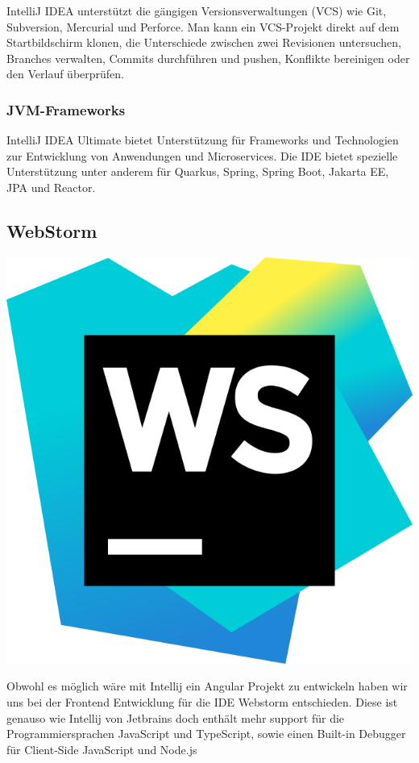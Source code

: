IntelliJ IDEA unterstützt die gängigen Versionsverwaltungen (VCS) wie Git, Subversion, Mercurial und Perforce. 
Man kann ein VCS-Projekt direkt auf dem Startbildschirm klonen, die Unterschiede zwischen zwei Revisionen untersuchen, Branches verwalten, 
Commits durchführen und pushen, Konflikte bereinigen oder den Verlauf überprüfen. 
\cite{sysarch-intellij-1}


\subsubsection{JVM-Frameworks}

IntelliJ IDEA Ultimate bietet Unterstützung für Frameworks und Technologien zur Entwicklung von Anwendungen und Microservices. 
Die IDE bietet spezielle Unterstützung unter anderem für Quarkus, Spring, Spring Boot, Jakarta EE, JPA und Reactor.
\cite{sysarch-intellij-1}


\subsection{WebStorm}
\includegraphics[scale=0.025]{pics/WebStormLogo.svg.png}


Obwohl es möglich wäre mit Intellij ein Angular Projekt zu entwickeln haben wir uns bei der Frontend Entwicklung 
für die IDE Webstorm entschieden. Diese ist genauso wie Intellij von Jetbrains doch enthält mehr support für die 
Programmiersprachen JavaScript und TypeScript, sowie einen Built-in Debugger für Client-Side JavaScript und Node.js 

